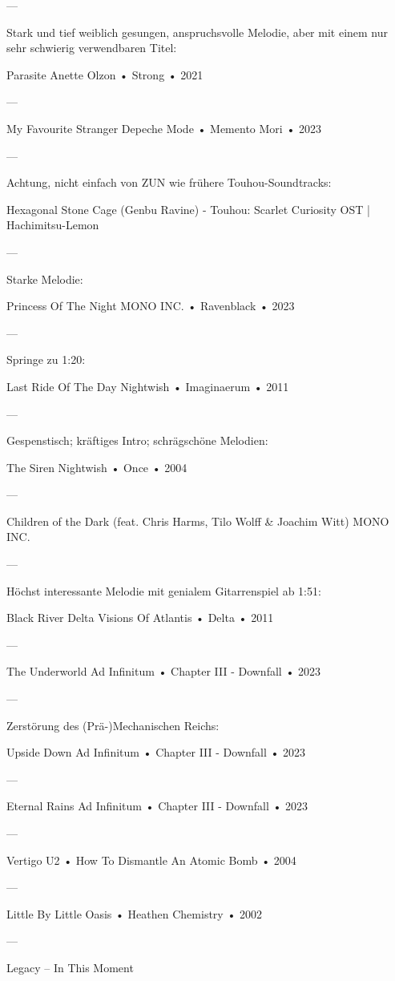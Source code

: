 —

Stark und tief weiblich gesungen, anspruchsvolle Melodie, aber mit einem nur sehr schwierig verwendbaren Titel:

Parasite
Anette Olzon
 •
Strong
 • 2021

—

My Favourite Stranger
Depeche Mode
 •
Memento Mori
 • 2023

—

Achtung, nicht einfach von ZUN wie frühere Touhou-Soundtracks:

Hexagonal Stone Cage (Genbu Ravine) - Touhou: Scarlet Curiosity OST | Hachimitsu-Lemon

—

Starke Melodie:

Princess Of The Night
MONO INC.
 •
Ravenblack
 • 2023

—

Springe zu 1:20:

Last Ride Of The Day
Nightwish
 •
Imaginaerum
 • 2011

—

Gespenstisch; kräftiges Intro; schrägschöne Melodien:

The Siren
Nightwish
 •
Once
 • 2004

—

Children of the Dark (feat. Chris Harms, Tilo Wolff & Joachim Witt)
MONO INC.

—

Höchst interessante Melodie mit genialem Gitarrenspiel ab 1:51:

Black River Delta
Visions Of Atlantis
 •
Delta
 • 2011

—

The Underworld
Ad Infinitum
 •
Chapter III - Downfall
 • 2023

—

Zerstörung des (Prä-)Mechanischen Reichs:

Upside Down
Ad Infinitum
 •
Chapter III - Downfall
 • 2023

—

Eternal Rains
Ad Infinitum
 •
Chapter III - Downfall
 • 2023

—

Vertigo
U2
 •
How To Dismantle An Atomic Bomb
 • 2004

—

Little By Little
Oasis
 •
Heathen Chemistry
 • 2002

—

Legacy – In This Moment

